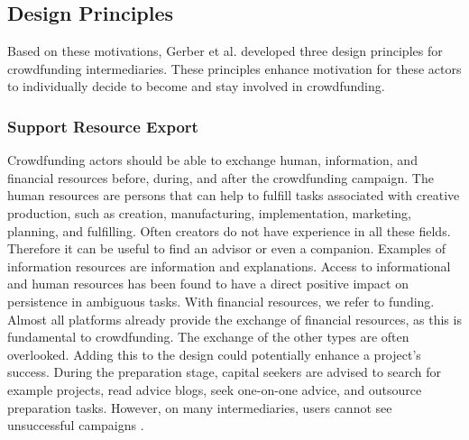 \subsection{Design Principles}
Based on these motivations, Gerber et al. \cite{crowdMotiv} developed three design principles for crowdfunding
intermediaries. These principles enhance motivation for these actors to individually decide to become and
stay involved in crowdfunding.

\subsubsection*{Support Resource Export}
Crowdfunding actors should be able to exchange human, information, and financial resources before, during, and after the crowdfunding campaign. The human resources are persons that can help to fulfill tasks
associated with creative production, such as creation, manufacturing, implementation, marketing, planning,
and fulfilling. Often creators do not have experience in all these fields. Therefore it can be useful to find
an advisor or even a companion. Examples of information resources are information and explanations. Access to informational and human resources has been found to have a direct positive impact on persistence
in ambiguous tasks. With financial resources, we refer to funding. Almost all platforms already provide the
exchange of financial resources, as this is fundamental to crowdfunding. The exchange of the other types are
often overlooked. Adding this to the design could potentially enhance a project’s success.
During the preparation stage, capital seekers are advised to search for example projects, read advice blogs,
seek one-on-one advice, and outsource preparation tasks. However, on many intermediaries, users cannot
see unsuccessful campaigns \cite{10.1145/2531602.2531715}.

